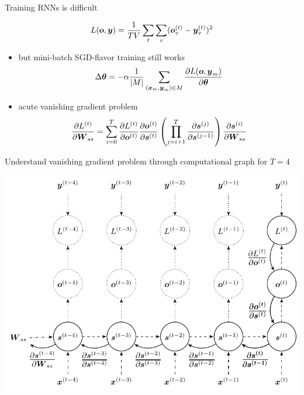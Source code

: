 \documentclass{beamer}
\begin{document}
  \begin{frame}{Training RNNs is difficult}
    
    \begin{equation*}
      L(\boldsymbol{o},\boldsymbol{y}) = \frac{1}{TV} \sum_t \sum_v(
      \boldsymbol{o}\sp{(t)}_v - \boldsymbol{y}\sp{(t)}_v
      )^2
    \end{equation*}

    \begin{itemize}
      \item but mini-batch SGD-flavor training still works
        \begin{equation*}
          \Delta \vc{\theta} =
          -\alpha
          \frac{1}{|M|} \sum_{(\vc{x}_m,\vc{y}_m) \in M}
          \frac{\partial{L}(
            \vc{o}%
            ,\vc{y}_m)}
          {\partial{\vc{\theta}}}
        \end{equation*}
      \item acute vanishing gradient problem
        \begin{equation*}
          \frac{\partial{L}\sp{(t)}}{\partial{\ensuremath{\boldsymbol{W}}_{ss}}} = 
          \sum_{i=0}^T
          \frac{\partial{    L}\sp{( t)}}{\partial{\ensuremath{\boldsymbol{o}}\ensuremath{\sp{(t)}}}}
          \frac{\partial{\ensuremath{\boldsymbol{o}}}\sp{(t)}}{\partial{\ensuremath{\boldsymbol{s}}\ensuremath{\sp{(t)}}}}
          \left(
            \prod_{j=i+1}^{T}
            \frac{\partial{\ensuremath{\boldsymbol{s}}}\sp{(j)}}{\partial{\ensuremath{\boldsymbol{s}}\ensuremath{\sp{(j-1)}}}}
          \right)
          \frac{\partial{\ensuremath{\boldsymbol{s}}}\sp{(i)}}{\partial{\ensuremath{\boldsymbol{W}}_{ss}}}
        \end{equation*}
      \end{itemize}

    \end{frame}


    \begin{frame}{Understand vanishing gradient problem through computational graph for $T=4$}

      \includegraphics[width=\textwidth]{figs/grad.pdf}

    \end{frame}
\end{document}
